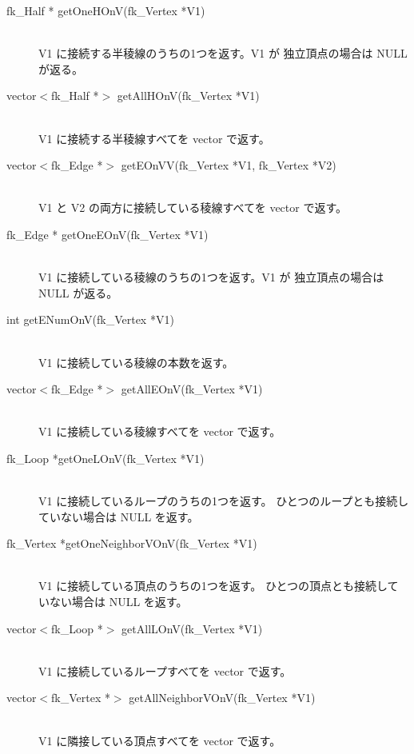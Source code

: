 \begin{description}
 \item[\hspace*{0.6cm}fk\_Half * getOneHOnV(fk\_Vertex *V1)] ~ \\
	V1 に接続する半稜線のうちの1つを返す。V1 が
	独立頂点の場合は NULL が返る。

 \item[\hspace*{0.6cm}vector\(<\)fk\_Half *\(>\)
	getAllHOnV(fk\_Vertex *V1)] ~ \\
	V1 に接続する半稜線すべてを vector で返す。

 \item[\hspace*{0.6cm}vector\(<\)fk\_Edge *\(>\)
	getEOnVV(fk\_Vertex *V1, fk\_Vertex *V2)] ~ \\
	V1 と V2 の両方に接続している稜線すべてを
	vector で返す。		

 \item[\hspace*{0.6cm}fk\_Edge * getOneEOnV(fk\_Vertex *V1)] ~ \\
	V1 に接続している稜線のうちの1つを返す。V1 が
	独立頂点の場合は NULL が返る。

 \item[\hspace*{0.6cm}int getENumOnV(fk\_Vertex *V1)] ~ \\
	V1 に接続している稜線の本数を返す。

 \item[\hspace*{0.6cm}vector\(<\)fk\_Edge *\(>\)
	getAllEOnV(fk\_Vertex *V1)] ~ \\
	V1 に接続している稜線すべてを vector で返す。

 \item[\hspace*{0.6cm}fk\_Loop *getOneLOnV(fk\_Vertex *V1)] ~ \\
	V1 に接続しているループのうちの1つを返す。
	ひとつのループとも接続していない場合は NULL を返す。

 \item[\hspace*{0.6cm}fk\_Vertex *getOneNeighborVOnV(fk\_Vertex *V1)] ~ \\
	V1 に接続している頂点のうちの1つを返す。
	ひとつの頂点とも接続していない場合は NULL を返す。

 \item[\hspace*{0.6cm}vector\(<\)fk\_Loop *\(>\)
	getAllLOnV(fk\_Vertex *V1)] ~ \\
	V1 に接続しているループすべてを vector で返す。

 \item[\hspace*{0.6cm}vector\(<\)fk\_Vertex *\(>\)
	getAllNeighborVOnV(fk\_Vertex *V1)] ~ \\
	V1 に隣接している頂点すべてを vector で返す。

\end{description}
